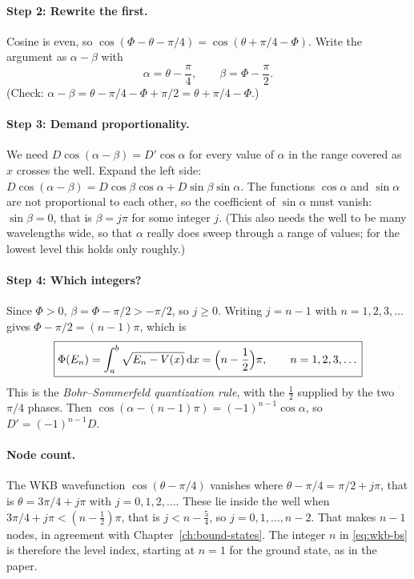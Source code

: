 \paragraph{Step 2: Rewrite the first.} Cosine is even, so $\cos(\Phi-\theta-\pi/4)=\cos(\theta+\pi/4-\Phi)$. Write the argument as $\alpha-\beta$ with
\begin{equation}
\alpha=\theta-\frac\pi4,\qquad\beta=\Phi-\frac\pi2 .
\end{equation}
(Check: $\alpha-\beta=\theta-\pi/4-\Phi+\pi/2=\theta+\pi/4-\Phi$.)

\paragraph{Step 3: Demand proportionality.} We need $D\cos(\alpha-\beta)=D'\cos\alpha$ for every value of $\alpha$ in the range covered as $x$ crosses the well. Expand the left side: $D\cos(\alpha-\beta)=D\cos\beta\cos\alpha+D\sin\beta\sin\alpha$. The functions $\cos\alpha$ and $\sin\alpha$ are not proportional to each other, so the coefficient of $\sin\alpha$ must vanish: $\sin\beta=0$, that is $\beta=j\pi$ for some integer $j$. (This also needs the well to be many wavelengths wide, so that $\alpha$ really does sweep through a range of values; for the lowest level this holds only roughly.)

\paragraph{Step 4: Which integers?} Since $\Phi>0$, $\beta=\Phi-\pi/2>-\pi/2$, so $j\ge0$. Writing $j=n-1$ with $n=1,2,3,\dots$ gives $\Phi-\pi/2=(n-1)\pi$, which is
\begin{equation}
\boxed{\Phi(E_n)=\int_{a}^{b}\sqrt{E_n-V(x)}\,\mathrm{d} x=\Bigl(n-\frac12\Bigr)\pi,\qquad n=1,2,3,\dots}
\label{eq:wkb-bs}
\end{equation}
This is the \emph{Bohr--Sommerfeld quantization rule}, with the $\tfrac12$ supplied by the two $\pi/4$ phases. Then $\cos(\alpha-(n-1)\pi)=(-1)^{n-1}\cos\alpha$, so $D'=(-1)^{n-1}D$.

\paragraph{Node count.} The WKB wavefunction $\cos(\theta-\pi/4)$ vanishes where $\theta-\pi/4=\pi/2+j\pi$, that is $\theta=3\pi/4+j\pi$ with $j=0,1,2,\dots$. These lie inside the well when $3\pi/4+j\pi<(n-\tfrac12)\pi$, that is $j<n-\tfrac54$, so $j=0,1,\dots,n-2$. That makes $n-1$ nodes, in agreement with Chapter~\ref{ch:bound-states}. The integer $n$ in \cref{eq:wkb-bs} is therefore the level index, starting at $n=1$ for the ground state, as in the paper.

